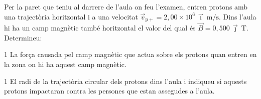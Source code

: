 Per la paret que teniu al darrere de l'aula on feu l'examen, entren protons amb una trajectòria horitzontal i a una velocitat $\vec{v}_\mathrm{p+} = 2,00\times 10^{6}\,\vec{\imath}\ \mathrm{m/s}$. Dins l'aula hi ha un camp magnètic també horitzontal el valor del qual és $\vec{B} = 0,500\,\vec{\jmath}\ \mathrm{T}$. Determineu:

\begin{apartat}{1}
La força causada pel camp magnètic que actua sobre els protons quan entren en la zona on hi ha aquest camp magnètic.
\end{apartat}

\begin{apartat}{1}
El radi de la trajectòria circular dels protons dins l'aula i indiqueu si aquests protons impactaran contra les persones que estan assegudes a l'aula.
\end{apartat}

